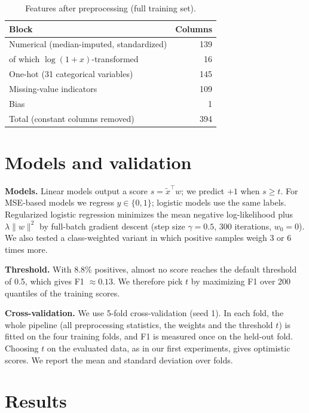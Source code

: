 \documentclass[10pt,conference,compsocconf]{IEEEtran}
\begin{document}
\begin{table}[htbp]
  \centering
  \caption{Features after preprocessing (full training set).}
  \label{tab:prep}
  \begin{tabular}{lr}
    \toprule
    Block & Columns \\
    \midrule
    Numerical (median-imputed, standardized) & 139 \\
    \quad of which $\log(1+x)$-transformed & 16 \\
    One-hot (31 categorical variables) & 145 \\
    Missing-value indicators & 109 \\
    Bias & 1 \\
    \midrule
    Total (constant columns removed) & 394 \\
    \bottomrule
  \end{tabular}
\end{table}

\section{Models and validation}

\textbf{Models.} Linear models output a score $s = \tilde{x}^\top w$; we
predict $+1$ when $s\ge t$. For MSE-based models we regress $y\in\{0,1\}$;
logistic models use the same labels. Regularized logistic regression minimizes
the mean negative log-likelihood plus $\lambda\|w\|^2$ by full-batch gradient
descent (step size $\gamma=0.5$, 300 iterations, $w_0=0$). We also tested a
class-weighted variant in which positive samples weigh 3 or 6 times more.

\textbf{Threshold.} With 8.8\% positives, almost no score reaches the
default threshold of 0.5, which gives F1 $\approx 0.13$. We therefore pick $t$
by maximizing F1 over 200 quantiles of the training scores.

\textbf{Cross-validation.} We use 5-fold cross-validation (seed 1). In each
fold, the whole pipeline (all preprocessing statistics, the weights and the
threshold $t$) is fitted on the four training folds, and F1 is measured once
on the held-out fold. Choosing $t$ on the evaluated data, as in our first
experiments, gives optimistic scores. We report the mean and standard
deviation over folds.

\section{Results}
\end{document}
